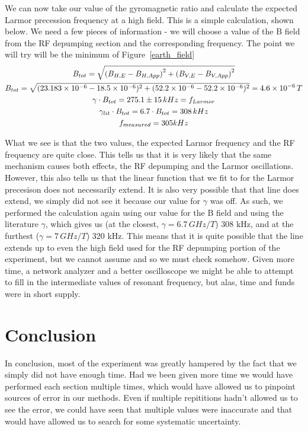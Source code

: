 \documentclass{article}
\DeclarePairedDelimiter{\parens}{\lparen}{\rparen}
\begin{document}
    \hspace{.25cm}

    We can now take our value of the gyromagnetic ratio and calculate the expected Larmor precession frequency at a high field.  This is a simple calculation, shown below.  We need a few pieces of information - we will choose a value of the B field from the RF depumping section and the corresponding frequency.  The point we will try will be the minimum of Figure~\ref{earth_field}
    \begin{gather*}
      B_{tot} = \sqrt{\parens*{B_{H,E} - B_{H, App}}^2 + \parens*{B_{V, E} - B_{V, App}}^2} \\
      B_{tot} = \sqrt{(23.183\times10^{-6}-18.5\times{10^{-6}})^2+(52.2\times10^{-6}-52.2\times10^{-6})^2} = 4.6\times10^{-6} \, T \\
      \gamma \cdot B_{tot} = 275.1 \pm 15 \, kHz = f_{Larmor} \\
      \gamma_{lit} \cdot B_{tot} = 6.7 \cdot B_{tot} = 308 \, kHz \\
      f_{measured} = 305 kHz \\
    \end{gather*}

    What we see is that the two values, the expected Larmor frequency and the RF frequency are quite close.  This tells us that it is very likely that the same mechanism causes both effects, the RF depumping and the Larmor oscillations.  However, this also tells us that the linear function that we fit to for the Larmor precesison does not necessarily extend.  It is also very possible that that line does extend, we simply did not see it because our value for $\gamma$ was off.  As such, we performed the calculation again using our value for the B field and using the literature $\gamma$, which gives us (at the closest, $\gamma = 6.7 \, GHz/T$) 308 kHz, and at the furthest ($\gamma = 7 \, GHz/T$) 320 kHz.  This means that it is quite possible that the line extends up to even the high field used for the RF depumping portion of the experiment, but we cannot assume and so we must check somehow.  Given more time, a network analyzer and a better oscilloscope we might be able to attempt to fill in the intermediate values of resonant frequency, but alas, time and funds were in short supply.


\section{Conclusion}%
  In conclusion, most of the experiment was greatly hampered by the fact that we simply did not have enough time.  Had we been given more time we would have performed each section multiple times, which would have allowed us to pinpoint sources of error in our methods.  Even if multiple repititions hadn't allowed us to see the error, we could have seen that multiple values were inaccurate and that would have allowed us to search for some systematic uncertainty.
\end{document}
